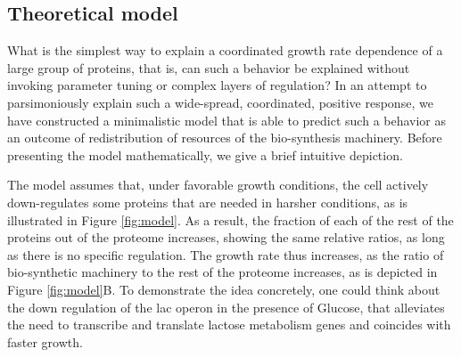 \subsection{Theoretical model}
What is the simplest way to explain a coordinated growth rate dependence of a large group of proteins, that is, can such a behavior be explained without invoking parameter tuning or complex layers of regulation?
In an attempt to parsimoniously explain such a wide-spread, coordinated, positive response, we have constructed a minimalistic model that is able to predict such a behavior as an outcome of redistribution of resources of the bio-synthesis machinery.
Before presenting the model mathematically, we give a brief intuitive depiction.

The model assumes that, under favorable growth conditions, the cell actively down-regulates some proteins that are needed in harsher conditions, as is illustrated in Figure \ref{fig:model}.
As a result, the fraction of each of the rest of the proteins out of the proteome increases, showing the same relative ratios, as long as there is no specific regulation.
The growth rate thus increases, as the ratio of bio-synthetic machinery to the rest of the proteome increases, as is depicted in Figure \ref{fig:model}B.
To demonstrate the idea concretely, one could think about the down regulation of the lac operon in the presence of Glucose, that alleviates the need to transcribe and translate lactose metabolism genes and coincides with faster growth.